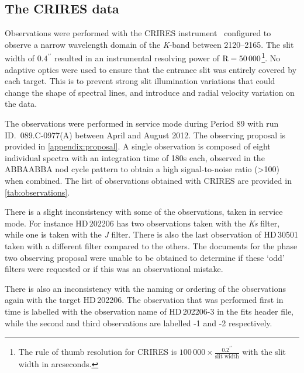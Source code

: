 
\begin{landscape}
    
\end{landscape}

\subsection{The {CRIRES} data}
\label{subsec:CRIRES}

Observations were performed with the {CRIRES} instrument~\citep{kaeufl_crires_2004} configured to observe a narrow wavelength domain of the \emph{K}-band between 2120--2165\nm{}.
The slit width of \(0.4^{\prime\prime}\) resulted in an instrumental resolving power of \(\textrm{R}=50\,000\)\footnote{The rule of thumb resolution for {CRIRES} is \(100\,000\times \frac{0.2^{\prime\prime}}{\textrm{slit width}}\) with the slit width in arcseconds.}.
No adaptive optics were used to ensure that the entrance slit was entirely covered by each target.
This is to prevent strong slit illumination variations that could change the shape of spectral lines, and introduce and radial velocity variation on the data.

The observations were performed in service mode during {Period 89} with run {ID.~089.C-0977(A)} between April and August 2012.
The observing proposal is provided in \cref{appendix:proposal}.
A single observation is composed of eight individual spectra with an integration time of 180\si{\second} each, observed in the {ABBAABBA} nod cycle pattern to obtain a high signal-to-noise ratio (>100) when combined.
The list of observations obtained with {CRIRES} are provided in \cref{tab:observations}.

There is a slight inconsistency with some of the observations, taken in service mode.
For instance {HD\,202206} has two observations taken with the \emph{Ks} filter, while one is taken with the \emph{J} filter.
There is also the last observation of {HD\,30501} taken with a different filter compared to the others.
The documents for the phase two observing proposal were unable to be obtained to determine if these `odd' filters were requested or if this was an observational mistake.

There is also an inconsistency with the naming or ordering of the observations again with the target {HD\,202206}.
The observation that was performed first in time is labelled with the observation name of {HD\,202206-3} in the fits header file, while the second and third observations are labelled -1 and -2 respectively.


